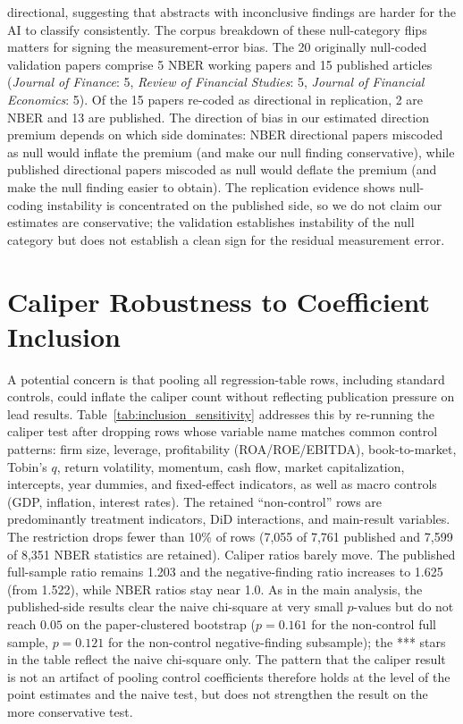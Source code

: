 \documentclass[12pt]{article}
\newcommand{\JF}{\textit{Journal of Finance}}
\newcommand{\RFS}{\textit{Review of Financial Studies}}
\newcommand{\JFE}{\textit{Journal of Financial Economics}}
\begin{document}
\begin{table}[H]
\begin{singlespace}
\begin{minipage}{\textwidth}
directional, suggesting that abstracts with inconclusive findings are
harder for the AI to classify consistently.
The corpus breakdown of these null-category flips matters for signing the
measurement-error bias.  The 20 originally null-coded validation papers
comprise 5 NBER working papers and 15 published articles
(\JF{}: 5, \RFS{}: 5, \JFE{}: 5).  Of the 15 papers re-coded as directional
in replication, 2 are NBER and 13 are published.  The direction of bias
in our estimated direction premium depends on which side dominates:
NBER directional papers miscoded as null would inflate the premium (and
make our null finding conservative), while published directional papers
miscoded as null would deflate the premium (and make the null finding
easier to obtain).  The replication evidence shows null-coding
instability is concentrated on the published side, so we do not
claim our estimates are conservative; the validation establishes
instability of the null category but does not establish a clean sign for
the residual measurement error.
\end{minipage}
\end{singlespace}
\end{table}

\section{Caliper Robustness to Coefficient Inclusion}

A potential concern is that pooling all regression-table rows, including
standard controls, could inflate the caliper count without reflecting
publication pressure on lead results.
Table~\ref{tab:inclusion_sensitivity} addresses this by re-running the caliper
test after dropping rows whose variable name matches common control patterns:
firm size, leverage, profitability (ROA/ROE/EBITDA), book-to-market, Tobin's $q$,
return volatility, momentum, cash flow, market capitalization, intercepts,
year dummies, and fixed-effect indicators, as well as macro controls (GDP,
inflation, interest rates).
The retained ``non-control'' rows are predominantly treatment indicators,
DiD interactions, and main-result variables.
The restriction drops fewer than 10\% of rows (7,055 of 7,761 published
and 7,599 of 8,351 NBER statistics are retained).
Caliper ratios barely move.  The published full-sample ratio
remains 1.203 and the negative-finding ratio increases to 1.625
(from 1.522), while NBER ratios stay near 1.0.  As in the main analysis,
the published-side results clear the naive chi-square at very small
$p$-values but do not reach $0.05$ on the paper-clustered bootstrap
($p = 0.161$ for the non-control full sample, $p = 0.121$ for the
non-control negative-finding subsample); the *** stars in the table reflect
the naive chi-square only.  The pattern that the caliper result is not an
artifact of pooling control coefficients therefore holds at the level of
the point estimates and the naive test, but does not strengthen the result
on the more conservative test.
\end{document}
